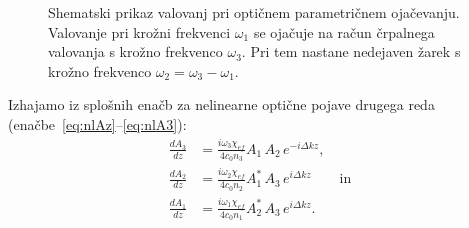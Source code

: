 \begin{figure}[ht]
\centering
\def\svgwidth{60truemm} 

\caption{Shematski prikaz valovanj pri optičnem parametričnem ojačevanju. Valovanje
pri krožni frekvenci $\omega_1$ se ojačuje na račun črpalnega valovanja s krožno frekvenco
$\omega_3$. Pri tem nastane nedejaven žarek s krožno frekvenco $\omega_2 =  \omega_3-\omega_1$.}
\label{fig:opa2}
\end{figure}
Izhajamo iz splošnih enačb za nelinearne optične pojave drugega reda
(enačbe~\ref{eq:nlAz}--\ref{eq:nlA3}): 
\begin{align}
\frac{dA_{3}}{dz} &=\frac{i\omega_{3}\chi_{ef}}{4c_0 n_3} A_{1}\, A_{2}\, e^{-i\Delta kz}, \\
\frac{dA_{2}}{dz} &=\frac{i\omega_{2}\chi_{ef}}{4c_0 n_2} A_{1}^*\, A_{3}\, e^{i\Delta kz}\qquad \textrm{in}\\
\frac{dA_{1}}{dz} &=\frac{i\omega_{1}\chi_{ef}}{4c_0 n_1} A_{2}^*\, A_{3}\, e^{i\Delta kz}.
\label{eq:opaA}
\end{align}

